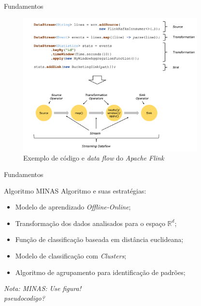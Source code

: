 \documentclass[aspectratio=43,10pt]{beamer}
\newcommand{\nota}[1]{\hspace*{-0.5cm}\textit{{\color[rgb]{1,0,0}Nota: #1}}}
\begin{document}
\begin{frame}[fragile]{Fundamentos}
\begin{figure}[ht]
\centering
\includegraphics[width=0.85\textwidth]{figuras/dataflow-code-flink.png}
\caption{Exemplo de código e \emph{data flow} do \emph{Apache Flink} \cite{ApacheFlink2020}}
\label{fig:dataflow-flink}
\end{figure}
\end{frame}

\begin{frame}[fragile]{Fundamentos}
\begin{alertblock}{Algoritmo MINAS}
  \vspace{5mm}
  Algoritmo e suas estratégias:
  \begin{itemize}
    \item Modelo de aprendizado \emph{Offline-Online};
    \item Transformação dos dados analisados para o espaço $\mathbb{R}^d$;
    \item Função de classificação baseada em distância euclideana;
    \item Modelo de classificação com \emph{Clusters};
    \item Algoritmo de agrupamento para identificação de padrões;
  \end{itemize}
\end{alertblock}
\nota{MINAS: Use figura!\\pseudocodigo?}
\end{frame}
\end{document}
